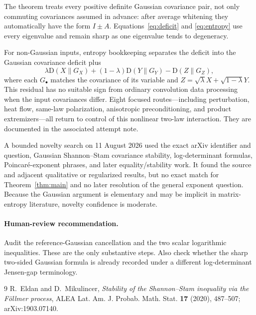 \documentclass[11pt]{article}
\newcommand{\D}{\mathrm D}
\begin{document}
The theorem treats every positive definite Gaussian covariance pair, not
only commuting covariances assumed in advance: after average whitening they
automatically have the form $I\pm A$.  Equations~\eqref{eq:deficit} and
\eqref{eq:entropy} use every eigenvalue and remain sharp as one eigenvalue
tends to degeneracy.

For non-Gaussian inputs, entropy bookkeeping separates the deficit into the
Gaussian covariance deficit plus
\[
 \lambda\D(X\|G_X)+(1-\lambda)\D(Y\|G_Y)-\D(Z\|G_Z),
\]
where each $G_\bullet$ matches the covariance of its variable and
$Z=\sqrt\lambda X+\sqrt{1-\lambda}Y$.  This residual has no suitable sign
from ordinary convolution data processing when the input covariances differ.
Eight focused routes---including perturbation, heat flow, same-law
polarization, anisotropic preconditioning, and product extremizers---all
return to control of this nonlinear two-law interaction.  They are documented
in the associated attempt note.

A bounded novelty search on 11 August 2026 used the exact arXiv identifier and
question, Gaussian Shannon--Stam covariance stability, log-determinant
formulas, Poincar\'e-exponent phrases, and later equality/stability work.  It
found the source and adjacent qualitative or regularized results, but no exact
match for Theorem~\ref{thm:main} and no later resolution of the general
exponent question.  Because the Gaussian argument is elementary and may be
implicit in matrix-entropy literature, novelty confidence is moderate.

\paragraph{Human-review recommendation.}
Audit the reference-Gaussian cancellation and the two scalar logarithmic
inequalities.  These are the only substantive steps.  Also check whether the
sharp two-sided Gaussian formula is already recorded under a different
log-determinant Jensen-gap terminology.

\begin{thebibliography}{9}
R.~Eldan and D.~Mikulincer,
\emph{Stability of the Shannon--Stam inequality via the F\"ollmer process},
ALEA Lat. Am. J. Probab. Math. Stat. \textbf{17} (2020), 487--507;
arXiv:1903.07140.
\end{thebibliography}
\end{document}
